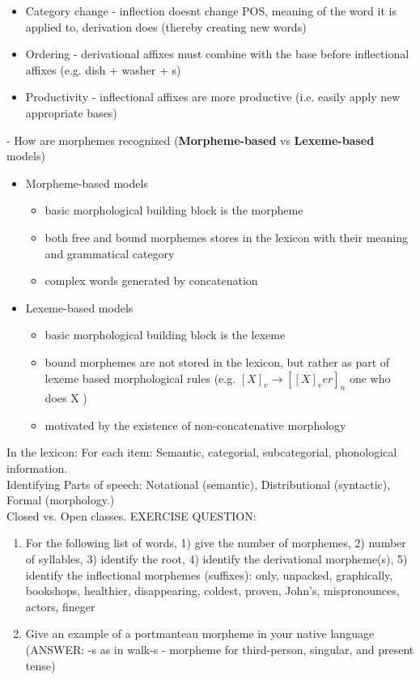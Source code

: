 \documentclass[11pt]{article}
\newenvironment{itemise}{
\begin{itemize}
  \setlength{\itemsep}{1pt}
  \setlength{\parskip}{0pt}
  \setlength{\parsep}{0pt}
}{\end{itemize}}
\begin{document}
\begin{itemise}
 \item Category change - inflection doesnt change POS, meaning of the word it is applied to, derivation does (thereby creating new words)
 \item Ordering - derivational affixes must combine with the base before inflectional affixes (e.g. dish + washer + s)
 \item Productivity - inflectional affixes are more productive (i.e. easily apply new appropriate bases)
\end{itemise}
- How are morphemes recognized ({\bf Morpheme-based} vs {\bf Lexeme-based} models)
\begin{itemise}
 \item Morpheme-based models
  \begin{itemise}
   \item basic morphological building block is the morpheme
   \item both free and bound morphemes stores in the lexicon with their meaning and grammatical category
   \item complex words generated by concatenation
  \end{itemise}
 \item Lexeme-based models
  \begin{itemise}
   \item basic morphological building block is the lexeme
   \item bound morphemes are not stored in the lexicon, but rather as part of lexeme based morphological rules (e.g. $[X]_v \rightarrow [[X]_v er]_n$ one who does X ) 
   \item motivated by the existence of non-concatenative morphology
  \end{itemise}
\end{itemise}
In the lexicon: For each item: Semantic, categorial, subcategorial, phonological information.\\
Identifying Parts of speech: Notational (semantic), Distributional (syntactic), Formal (morphology.)\\
Closed vs. Open classes.
EXERCISE QUESTION:

\begin{enumerate}
 \item For the following list of words, 1) give the number of morphemes, 2) number of syllables, 3) identify the root, 4) identify the derivational morpheme(s), 5) identify the inflectional morphemes (suffixes): only, unpacked, graphically, bookshops, healthier, disappearing, coldest, proven, John's, mispronounces, actors, fineger
 \item Give an example of a portmanteau morpheme in your native language (ANSWER: -s as in walk-s - morpheme for third-person, singular, and present tense)
\end{enumerate}
\end{document}
